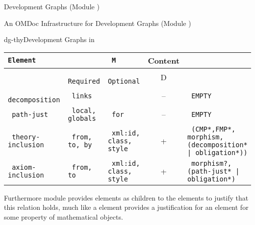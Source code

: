\begin{omgroup}[id=complex-theories,short=Complex Theories,
                            creators=miko,contributors=frabe]
\begin{omgroup}[id=development-graphs,short=Development Graphs]{Development Graphs (Module
  {})}
\begin{module}[id=dgraph]
\begin{omgroup}[id=dg-omdoc,short=OMDoc Development Graphs]{An OMDoc Infrastructure for
  Development Graphs (Module {})}
\begin{presonly}
\begin{myfig}{dg-thy}{Development Graphs in \omdoc}
\begin{scriptsize}
\begin{tabular}{|>{\tt}l|>{\tt}p{}|>{\tt}p{}|c|>{\tt}p{}|}\hline
{\rm Element}& \multicolumn{2}{l|}{Attributes} & M & Content  \\\hline
             & {\rm Required} & {\rm Optional} & D &           \\\hline\hline
 decomposition  & links       &                            & -- & EMPTY\\\hline
 path-just   & local, globals & for                        & -- & EMPTY\\\hline
 theory-inclusion & from, to, by  
                              & xml:id, class, style               & +  
                                          & (CMP*,FMP*, morphism, 
                                             (decomposition* | obligation*))\\\hline
 axiom-inclusion  & from, to  & xml:id, class, style           & +  
                                          & morphism?, (path-just* | obligation*)\\\hline
\end{tabular}
\end{scriptsize}
\end{myfig}
\end{presonly}

Furthermore module {} provides  elements as children
to the  elements to justify that this relation holds, much like
a  element provides a justification for an  element
for some property of mathematical objects.


\end{omgroup}
\end{module}
\end{omgroup}
\end{omgroup}
